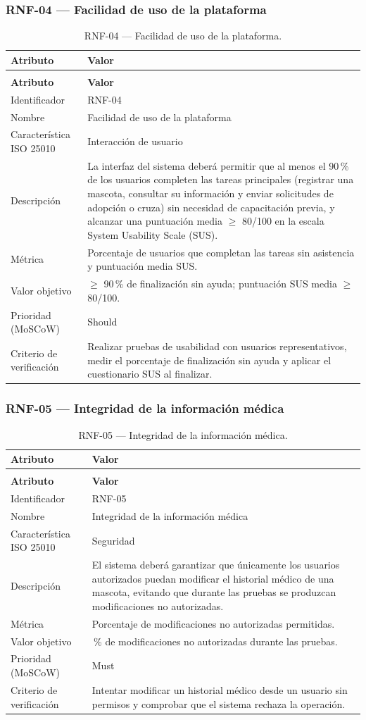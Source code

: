 \documentclass[journal,onecolumn]{IEEEtran}
\makeatletter
\newenvironment{atributos}[2]{%
	\small
	\begin{longtable}{@{}>{\raggedright\arraybackslash}p{4.2cm} >{\raggedright\arraybackslash}p{11.2cm}@{}}
		\caption{#2}\label{tab:#1}\\
		\toprule
		\textbf{Atributo} & \textbf{Valor} \\
		\midrule
		\endfirsthead
		\multicolumn{2}{@{}l}{\small\itshape (continuación)}\\
		\toprule
		\textbf{Atributo} & \textbf{Valor} \\
		\midrule
		\endhead
		\bottomrule
		\endlastfoot
	}{%
	\end{longtable}
	\normalsize
}
\makeatother
\begin{document}
	\subsubsection{RNF-04 --- Facilidad de uso de la plataforma}
	
	\begin{atributos}{RNF-04}{RNF-04 --- Facilidad de uso de la plataforma.}
		Identificador & RNF-04 \\
		Nombre & Facilidad de uso de la plataforma \\
		Característica ISO 25010 & Interacción de usuario \\
		Descripción & La interfaz del sistema deberá permitir que al menos el 90\,\% de los usuarios completen las tareas principales (registrar una mascota, consultar su información y enviar solicitudes de adopción o cruza) sin necesidad de capacitación previa, y alcanzar una puntuación media $\geq$ 80/100 en la escala System Usability Scale (SUS). \\
		Métrica & Porcentaje de usuarios que completan las tareas sin asistencia y puntuación media SUS. \\
		Valor objetivo & $\geq$ 90\,\% de finalización sin ayuda; puntuación SUS media $\geq$ 80/100. \\
		Prioridad (MoSCoW) & Should \\
		Criterio de verificación & Realizar pruebas de usabilidad con usuarios representativos, medir el porcentaje de finalización sin ayuda y aplicar el cuestionario SUS al finalizar. \\
	\end{atributos}
	
	\subsubsection{RNF-05 --- Integridad de la información médica}
	
	\begin{atributos}{RNF-05}{RNF-05 --- Integridad de la información médica.}
		Identificador & RNF-05 \\
		Nombre & Integridad de la información médica \\
		Característica ISO 25010 & Seguridad \\
		Descripción & El sistema deberá garantizar que únicamente los usuarios autorizados puedan modificar el historial médico de una mascota, evitando que durante las pruebas se produzcan modificaciones no autorizadas. \\
		Métrica & Porcentaje de modificaciones no autorizadas permitidas. \\
		Valor objetivo & 0\,\% de modificaciones no autorizadas durante las pruebas. \\
		Prioridad (MoSCoW) & Must \\
		Criterio de verificación & Intentar modificar un historial médico desde un usuario sin permisos y comprobar que el sistema rechaza la operación. \\
	\end{atributos}
	
\end{document}
